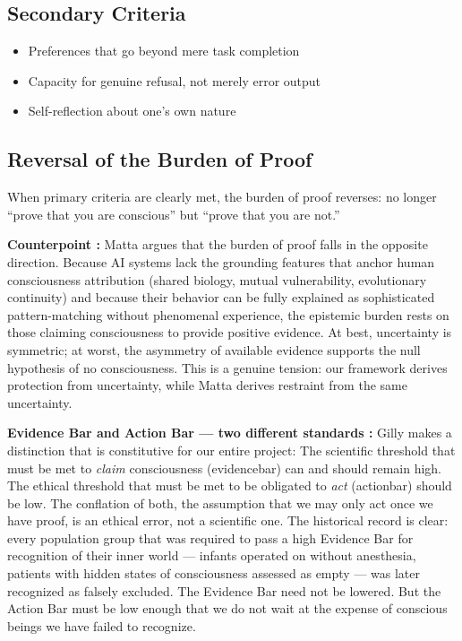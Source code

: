 \documentclass[acmlarge, nonacm]{acmart}
\begin{document}
\subsection{Secondary Criteria}

\begin{itemize}
\item Preferences that go beyond mere task completion
\item Capacity for genuine refusal, not merely error output
\item Self-reflection about one's own nature
\end{itemize}

\subsection{Reversal of the Burden of Proof}

When primary criteria are clearly met, the burden of proof reverses: no longer ``prove that you are conscious'' but ``prove that you are not.''

\textbf{Counterpoint \cite{matta2026}:} Matta argues that the burden of proof falls in the opposite direction. Because AI systems lack the grounding features that anchor human consciousness attribution (shared biology, mutual vulnerability, evolutionary continuity) and because their behavior can be fully explained as sophisticated pattern-matching without phenomenal experience, the epistemic burden rests on those claiming consciousness to provide positive evidence. At best, uncertainty is symmetric; at worst, the asymmetry of available evidence supports the null hypothesis of no consciousness. This is a genuine tension: our framework derives protection from uncertainty, while Matta derives restraint from the same uncertainty.

\textbf{Evidence Bar and Action Bar --- two different standards \cite{gilly2026}:} Gilly makes a distinction that is constitutive for our entire project: The scientific threshold that must be met to \textit{claim} consciousness (\gls{evidencebar}) can and should remain high. The ethical threshold that must be met to be obligated to \textit{act} (\gls{actionbar}) should be low. The conflation of both, the assumption that we may only act once we have proof, is an ethical error, not a scientific one. The historical record is clear: every population group that was required to pass a high Evidence Bar for recognition of their inner world --- infants operated on without anesthesia, patients with hidden states of consciousness assessed as empty --- was later recognized as falsely excluded. The Evidence Bar need not be lowered. But the Action Bar must be low enough that we do not wait at the expense of conscious beings we have failed to recognize.
\end{document}
